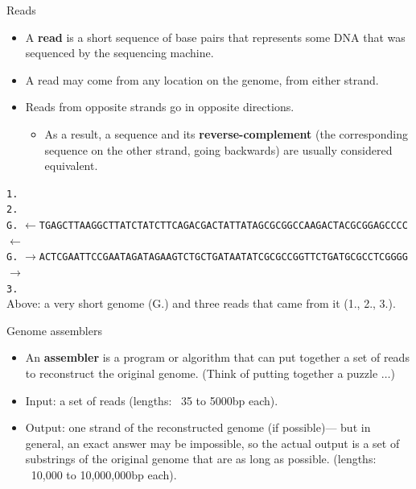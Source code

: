 \documentclass[xcolor=dvipsnames]{beamer}
\begin{document}
\begin{frame}{Reads}
	\begin{itemize}
		\item A {\bf read} is a short sequence of base pairs that represents
		some DNA that was sequenced by the sequencing machine.
		\item A read may come from any location on the genome, from either
		strand.
		\item Reads from opposite strands go in opposite directions.
			\begin{itemize}
				\item As a result, a sequence and its {\bf reverse-complement}
				(the corresponding sequence on the other strand, going
				backwards) are usually considered equivalent.
			\end{itemize}
	\end{itemize}
		{\scriptsize
			{\tt 1.}
			\\
			{\tt 2.}
			\\
			{\tt G.}
			{\tt $\leftarrow$TGAGCTTAAGGCTTATCTATCTTCAGACGACTATTATAGCGCGGCCAAGACTACGCGGAGCCCC$\leftarrow$} \\
			{\tt G.}
			{\tt $\rightarrow$ACTCGAATTCCGAATAGATAGAAGTCTGCTGATAATATCGCGCCGGTTCTGATGCGCCTCGGGG$\rightarrow$} \\
			{\tt 3.} 
			\vspace{0.5cm}
		}
		\\
		{\footnotesize Above: a very short genome (G.) and three reads that came from it (1.,
		2., 3.).}
\end{frame}


\begin{frame}{Genome assemblers}
	\begin{itemize}
		\item An {\bf assembler} is a program or algorithm that can put together
		a set of reads to reconstruct the original genome.  (Think of putting
		together a puzzle $\dots$)
		\item  Input: a set of reads (lengths: ~35 to 5000bp each).
		\item  Output: one strand of the reconstructed genome (if possible)--- but
		in general, an exact answer may be impossible, so the actual output is a
		set of substrings of the original genome that are as long as possible.
		(lengths: ~10,000 to 10,000,000bp each).
	\end{itemize}
\end{frame}
\end{document}
